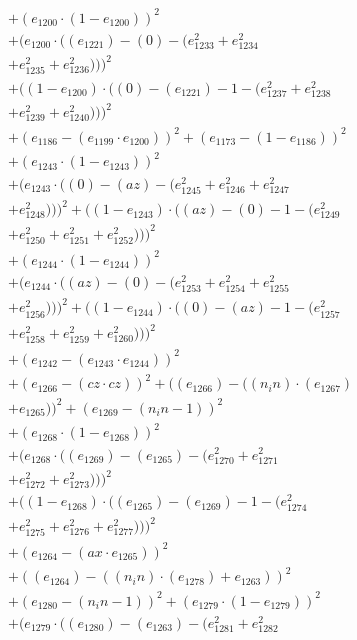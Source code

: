 \documentclass[10pt, a4paper]{article}
\begin{document}
\begin{small}
\begin{align*}
& + (e_{1200}  \cdot  (1 - e_{1200}))^{2} \\
& + (e_{1200}  \cdot  ((e_{1221}) - (0) - (e_{1233}^{2} + e_{1234}^{2} \\
& + e_{1235}^{2} + e_{1236}^{2})))^{2} \\
& + ((1 - e_{1200})  \cdot  ((0) - (e_{1221}) - 1 - (e_{1237}^{2} + e_{1238}^{2} \\
& + e_{1239}^{2} + e_{1240}^{2})))^{2} \\
& + (e_{1186} - (e_{1199}  \cdot  e_{1200}))^{2} + (e_{1173} - (1 - e_{1186}))^{2} \\
& + (e_{1243}  \cdot  (1 - e_{1243}))^{2} \\
& + (e_{1243}  \cdot  ((0) - (az) - (e_{1245}^{2} + e_{1246}^{2} + e_{1247}^{2} \\
& + e_{1248}^{2})))^{2} + ((1 - e_{1243})  \cdot  ((az) - (0) - 1 - (e_{1249}^{2} \\
& + e_{1250}^{2} + e_{1251}^{2} + e_{1252}^{2})))^{2} \\
& + (e_{1244}  \cdot  (1 - e_{1244}))^{2} \\
& + (e_{1244}  \cdot  ((az) - (0) - (e_{1253}^{2} + e_{1254}^{2} + e_{1255}^{2} \\
& + e_{1256}^{2})))^{2} + ((1 - e_{1244})  \cdot  ((0) - (az) - 1 - (e_{1257}^{2} \\
& + e_{1258}^{2} + e_{1259}^{2} + e_{1260}^{2})))^{2} \\
& + (e_{1242} - (e_{1243}  \cdot  e_{1244}))^{2} \\
& + (e_{1266} - (cz  \cdot  cz))^{2} + ((e_{1266}) - ((n_in)  \cdot  (e_{1267}) \\
& + e_{1265}))^{2} + (e_{1269} - (n_in - 1))^{2} \\
& + (e_{1268}  \cdot  (1 - e_{1268}))^{2} \\
& + (e_{1268}  \cdot  ((e_{1269}) - (e_{1265}) - (e_{1270}^{2} + e_{1271}^{2} \\
& + e_{1272}^{2} + e_{1273}^{2})))^{2} \\
& + ((1 - e_{1268})  \cdot  ((e_{1265}) - (e_{1269}) - 1 - (e_{1274}^{2} \\
& + e_{1275}^{2} + e_{1276}^{2} + e_{1277}^{2})))^{2} \\
& + (e_{1264} - (ax  \cdot  e_{1265}))^{2} \\
& + ((e_{1264}) - ((n_in)  \cdot  (e_{1278}) + e_{1263}))^{2} \\
& + (e_{1280} - (n_in - 1))^{2} + (e_{1279}  \cdot  (1 - e_{1279}))^{2} \\
& + (e_{1279}  \cdot  ((e_{1280}) - (e_{1263}) - (e_{1281}^{2} + e_{1282}^{2} \\

\end{align*}
\end{small}
\end{document}
